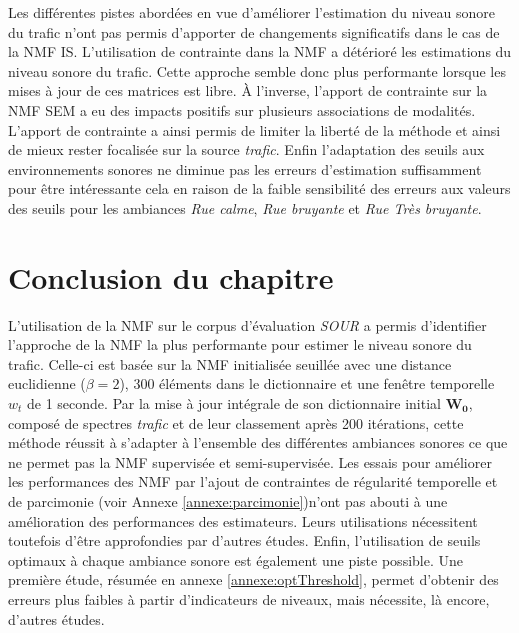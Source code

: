 Les différentes pistes abordées en vue d'améliorer l'estimation du niveau sonore du trafic n'ont pas permis d'apporter de changements significatifs dans le cas de la NMF IS. L'utilisation de contrainte dans la NMF a détérioré les estimations du niveau sonore du trafic. Cette approche semble donc plus performante lorsque les mises à jour de ces matrices est libre. À l'inverse, l'apport de contrainte sur la NMF SEM a eu des impacts positifs sur plusieurs associations de modalités. L'apport de contrainte a ainsi permis de limiter la liberté de la méthode et ainsi de mieux rester focalisée sur la source \textit{trafic}. Enfin l'adaptation des seuils aux environnements sonores ne diminue pas les erreurs d'estimation suffisamment pour être intéressante cela en raison de la faible sensibilité des erreurs aux valeurs des seuils pour les ambiances \textit{Rue calme}, \textit{Rue bruyante} et \textit{Rue Très bruyante}.
\\

\section{Conclusion du chapitre}
L'utilisation de la NMF sur le corpus d'évaluation \textit{SOUR} a permis d'identifier l'approche de la NMF la plus performante pour estimer le niveau sonore du trafic. Celle-ci est basée sur la NMF initialisée seuillée avec une distance euclidienne ($\beta = 2$), 300 éléments dans le dictionnaire et une fenêtre temporelle $w_t$ de 1 seconde. Par la mise à jour intégrale de son dictionnaire initial $\mathbf{W_0}$, composé de spectres \textit{trafic} et de leur classement après 200 itérations, cette méthode réussit à s'adapter à l'ensemble des différentes ambiances sonores ce que ne permet pas la NMF supervisée et semi-supervisée. Les essais pour améliorer les performances des NMF par l'ajout de contraintes de régularité temporelle et de parcimonie (voir Annexe \ref{annexe:parcimonie})n'ont pas abouti à une amélioration des performances des estimateurs. Leurs utilisations nécessitent toutefois d'être approfondies par d'autres études. Enfin, l'utilisation de seuils optimaux à chaque ambiance sonore est également une piste possible. Une première étude, résumée en annexe \ref{annexe:optThreshold}, permet d'obtenir des erreurs plus faibles à partir d'indicateurs de niveaux, mais nécessite, là encore, d'autres études. 

%